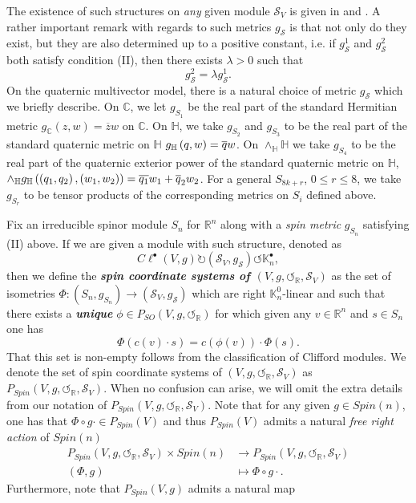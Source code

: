 \documentclass[openany, 11pt]{article}
\theoremstyle{definition}
\theoremstyle{remark}
\def\lp{\ensuremath{\left(}}
\def\rp{\ensuremath{\right)}}
\def\Sc{\ensuremath{\mathscr{S}}}
\def\cal{\ensuremath{\boldsymbol{\circlearrowleft}}}
\def\bC{\ensuremath{\mathbb{C}}}
\def\bH{\ensuremath{\mathbb{H}}}
\def\bR{\ensuremath{\mathbb{R}}}
\def\bK{\ensuremath{\mathbb{K}}}
\begin{document}
The existence of such structures on \emph{any} given module $\Sc_V$ is given in \cite{ABS} and \cite{LM}. A rather important remark with regards to such metrics $g_{\Sc}$ is that not only do they exist, but they are also determined up to a positive constant, i.e. if $g^1_{\Sc}$ and $g^2_{\Sc}$ both satisfy condition (II), then there exists $\lambda>0$ such that
\[
    g^2_{\Sc}=\lambda g^1_{\Sc}.
\]
On the quaternic multivector model, there is a natural choice of metric $g_{\Sc}$ which we briefly describe. On $\bC$, we let $g_{S_1}$ be the real part of the standard Hermitian metric $g_{\bC}(z,w)=\overline{z}w$ on $\bC$. On $\bH$, we take $g_{S_2}$ and $g_{S_3}$ to be the real part of the standard quaternic metric on $\bH$ $g_{\bH}\lp q,w\rp=\overline{q}w$. On $\wedge_{\bH}\bH$ we take $g_{S_4}$ to be the real part of the quaternic exterior power of the standard quaternic metric on $\bH$, $\wedge_{\bH}g_{\bH}\lp \lp q_1,q_2\rp,\lp w_1,w_2\rp\rp=\overline{q_1}w_1+\overline{q}_2w_2$. For a general $S_{8k+r}$, $0\leq r\leq 8$, we take $g_{S_r}$ to be tensor products of the corresponding metrics on $S_i$ defined above.\par
Fix an irreducible spinor module $S_n$ for $\bR^n$ along with a \emph{spin metric} $g_{S_n}$ satisfying (II) above. If we are given a module with such structure, denoted as
\[
   C\ell^{\bullet}(V,g)\circlearrowright(\Sc_V,g_{\Sc})\circlearrowleft\bK^{\bullet}_n, 
\]
then we define the \textbf{\emph{spin coordinate systems of $(V,g,\cal_{\bR},\Sc_V)$}} as the set of isometries $\Phi:(S_n,g_{S_n})\rightarrow (\Sc_V,g_{\Sc})$ which are right $\bK^0_n$-linear and such that there exists a \textbf{\emph{unique}} $\phi\in P_{SO}(V,g,\cal_{\bR})$ for which given any $v\in \bR^n$ and $s\in S_n$ one has
\[
    \Phi(c(v)\cdot s)=c(\phi(v))\cdot\Phi(s).
\]
That this set is non-empty follows from the classification of Clifford modules. We denote the set of spin coordinate systems of $(V,g,\cal_{\bR},\Sc_V)$ as $P_{Spin}(V,g,\cal_{\bR},\Sc_V)$. When no confusion can arise, we will omit the extra details from our notation of $P_{Spin}(V,g,\cal_{\bR},\Sc_V)$. Note that for any given $g\in Spin(n)$, one has that $\Phi\circ g\cdot\in P_{Spin}(V)$ and thus $P_{Spin}(V)$ admits a natural \emph{free right action} of $Spin(n)$
\begin{align*}
    P_{Spin}(V,g,\cal_{\bR},\Sc_V)\times Spin(n)&\longrightarrow P_{Spin}(V,g,\cal_{\bR},\Sc_V)\\
    (\Phi,g)&\longmapsto \Phi\circ g\cdot.
\end{align*}
Furthermore, note that $P_{Spin}(V,g)$ admits a natural map
\end{document}
